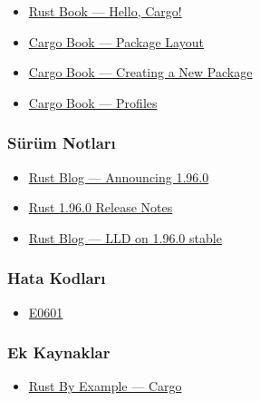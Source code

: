 \documentclass[12pt,a4paper]{article}
\begin{document}
\begin{itemize}
\tightlist
\item
  \href{https://doc.rust-lang.org/book/ch01-03-hello-cargo.html}{Rust Book --- Hello, Cargo!}
\item
  \href{https://doc.rust-lang.org/cargo/guide/project-layout.html}{Cargo Book --- Package Layout}
\item
  \href{https://doc.rust-lang.org/cargo/guide/creating-a-new-project.html}{Cargo Book --- Creating a New Package}
\item
  \href{https://doc.rust-lang.org/cargo/reference/profiles.html}{Cargo Book --- Profiles}
\end{itemize}

\subsubsection{Sürüm Notları}\label{sürüm-notları}

\begin{itemize}
\tightlist
\item
  \href{https://blog.rust-lang.org/2026/05/28/Rust-1.96.0/}{Rust Blog --- Announcing 1.96.0}
\item
  \href{https://doc.rust-lang.org/stable/releases.html\#version-1960-2026-05-28}{Rust 1.96.0 Release Notes}
\item
  \href{https://blog.rust-lang.org/2026/05/28/Rust-1.96.0/}{Rust Blog --- LLD on 1.96.0 stable}
\end{itemize}

\subsubsection{Hata Kodları}\label{hata-kodları}

\begin{itemize}
\tightlist
\item
  \href{https://doc.rust-lang.org/error_codes/E0601.html}{E0601}
\end{itemize}

\subsubsection{Ek Kaynaklar}\label{ek-kaynaklar}

\begin{itemize}
\tightlist
\item
  \href{https://doc.rust-lang.org/rust-by-example/cargo.html}{Rust By Example --- Cargo}
\end{itemize}
\end{document}
